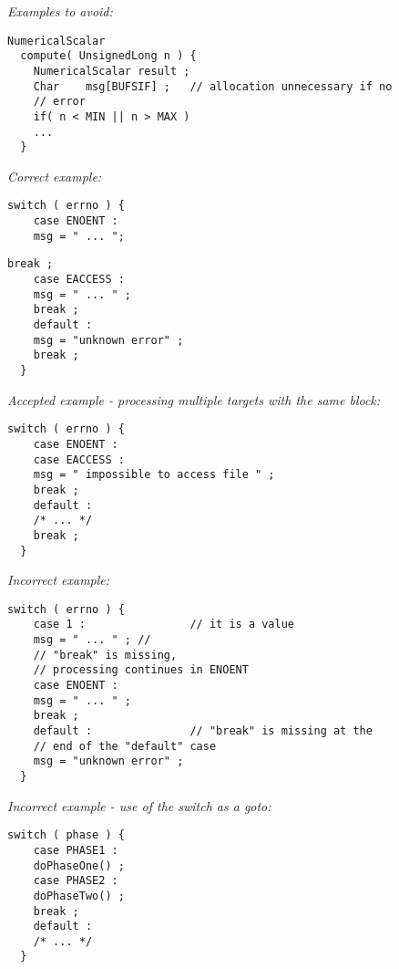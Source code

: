 \emph{Examples to avoid:}
\begin{lstlisting}[frame=TBRL]
  NumericalScalar
  compute( UnsignedLong n ) {
    NumericalScalar result ;
    Char    msg[BUFSIF] ;   // allocation unnecessary if no
    // error
    if( n < MIN || n > MAX )
    ...
  }
\end{lstlisting}


\emph{Correct example:}
\begin{lstlisting}[frame=TRL]
  switch ( errno ) {
    case ENOENT :
    msg = " ... ";
  \end{lstlisting}
  \begin{lstlisting}[frame=BRL]
    break ;
    case EACCESS :
    msg = " ... " ;
    break ;
    default :
    msg = "unknown error" ;
    break ;
  }
\end{lstlisting}

\emph{Accepted example - processing multiple targets with the same block:}
\begin{lstlisting}[frame=TBRL]
  switch ( errno ) {
    case ENOENT :
    case EACCESS :
    msg = " impossible to access file " ;
    break ;
    default :
    /* ... */
    break ;
  }
\end{lstlisting}

\emph{Incorrect example:}
\begin{lstlisting}[frame=TBRL]
  switch ( errno ) {
    case 1 :                // it is a value
    msg = " ... " ; //
    // "break" is missing,
    // processing continues in ENOENT
    case ENOENT :
    msg = " ... " ;
    break ;
    default :               // "break" is missing at the
    // end of the "default" case
    msg = "unknown error" ;
  }
\end{lstlisting}

\emph{Incorrect example - use of the switch as a goto:}
\begin{lstlisting}[frame=TBRL]
  switch ( phase ) {
    case PHASE1 :
    doPhaseOne() ;
    case PHASE2 :
    doPhaseTwo() ;
    break ;
    default :
    /* ... */
  }
\end{lstlisting}

